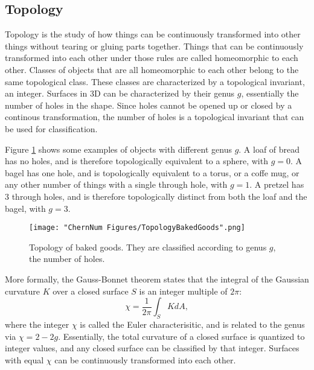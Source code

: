 \subsection{Topology}
Topology is the study of how things can be continuously transformed into other things without tearing or gluing parts together. Things that can be continuously transformed into each other under those rules are called homeomorphic to each other. Classes of objects that are all homeomorphic to each other belong to the same topological class. These classes are characterized by a topological invariant, an integer. Surfaces in 3D can be characterized by their genus $g$, essentially the number of holes in the shape. Since holes cannot be opened up or closed by a continous transformation, the number of holes is a topological invariant that can be used for classification. 

Figure \ref{fig:bakedGoods} shows some examples of objects with different genus $g$. A loaf of bread has no holes, and is therefore topologically equivalent to a sphere, with $g=0$. A bagel has one hole, and is topologically equivalent to a torus, or a coffe mug, or any other number of things with a single through hole, with $g=1$. A pretzel has $3$ through holes, and is therefore topologically distinct from both the loaf and the bagel, with $g=3$. 
\begin{figure}
	\texttt{[image: "ChernNum Figures/TopologyBakedGoods".png]}
\label{fig:bakedGoods}
\caption[Topology of baked goods]{Topology of baked goods. They are classified according to genus $g$, the number of holes.}
\end{figure}

More formally, the Gauss-Bonnet theorem states that the integral of the Gaussian curvature $K$ over a closed surface $S$ is an integer multiple of $2\pi$:
\begin{equation}
\chi = \frac{1}{2\pi}\int_S K dA,
\label{eqn:GaussBonnet}
\end{equation}
where the integer $\chi$ is called the Euler characterisitic, and is related to the genus via $\chi = 2 - 2g$. Essentially, the total curvature of a closed surface is quantized to integer values, and any closed surface can be classified by that integer. Surfaces with equal $\chi$ can be continuously transformed into each other.

